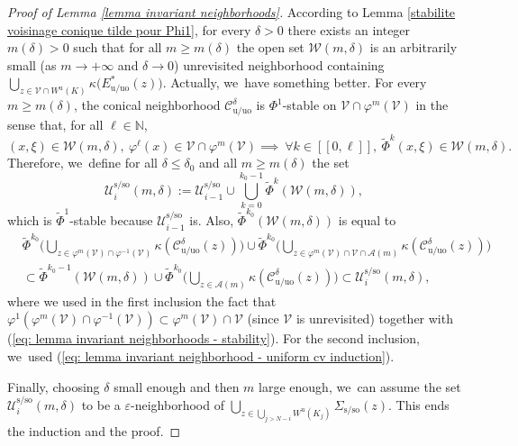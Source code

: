 \documentclass[11pt]{article}
\let\oldbigcup\bigcup
\newcommand{\lcr}{[\![}
\newcommand{\rcr}{]\!]}
\newcommand{\rs}{\mathrm{s}}
\newcommand{\rso}{\mathrm{so}}
\newcommand{\ru}{\mathrm{u}}
\newcommand{\ruo}{\mathrm{uo}}
\theoremstyle{definition}
\theoremstyle{plain}
\newcommand{\Acal}{\mathcal{A}}
\newcommand{\Ccal}{\mathcal{C}}
\newcommand{\N}{\mathbb{N}}
\newcommand{\Ucal}{\mathcal{U}}
\newcommand{\Vcal}{\mathcal{V}}
\newcommand{\Wcal}{\mathcal{W}}
\begin{document}
\begin{proof}[Proof of Lemma \ref{lemma invariant neighborhoods}]
According to Lemma \ref{stabilite voisinage conique tilde pour Phi1}, for every $\delta > 0$ there exists an integer $m(\delta) > 0$ such that for all $m \geq m (\delta)$ the open set $\Wcal(m,\delta)$ is an arbitrarily small (as $m \to + \infty$ and $\delta \to 0$) unrevisited neighborhood containing $\bigcup_{z \in \Vcal\cap W^\ru (K)} \kappa \bigl(E_{\ru/\ruo}^* (z) \bigr)$. Actually, we~have something better. For every $m \geq m(\delta)$, the conical neighborhood $\Ccal_{\ru/\ruo}^{\delta}$ is $\Phi^1$-stable on $\Vcal \cap \varphi^m (\Vcal)$ in the sense that, for all $\ell \in \N$,
\begin{equation}\label{eq: lemma invariant neighborhoods - stability}
(x,\xi) \in \Wcal (m,\delta), \: \varphi^{\ell} (x) \in \Vcal \cap \varphi^{m} (\Vcal) \implies \: \forall k \in \lcr0, \ell \rcr, \: \widetilde{\Phi}^k (x,\xi) \in \Wcal (m,\delta).
\end{equation}
Therefore, we~define for all $\delta \leq \delta_0$ and all $m \geq m (\delta)$ the set
\[
\Ucal_i^{\rs/\rso} (m,\delta):= \Ucal_{i-1}^{\rs/\rso} \cup \bigcup_{k = 0}^{k_0 - 1} \widetilde{\Phi}^k (\Wcal (m,\delta)),
\]
which is $\widetilde{\Phi}^1$-stable because $\Ucal_{i-1}^{\rs/\rso}$ is. Also, $\widetilde{\Phi}^{k_0} (\Wcal (m,\delta))$ is equal to
\begin{align*}
& \widetilde{\Phi}^{k_0 } \biggl(\bigcup_{z \in \varphi^{m} (\Vcal) \cap \varphi^{-1} (\Vcal)} \kappa (\Ccal_{\ru/\ruo}^{\delta}(z)) \biggr) \cup \widetilde{\Phi}^{k_0} \biggl(\bigcup_{z \in \varphi^m (\Vcal) \cap \Vcal \cap \Acal (m)} \kappa (\Ccal_{\ru/\ruo}^{\delta}(z)) \biggr) \\
&\subset \widetilde{\Phi}^{k_0 -1} \left(\Wcal (m,\delta) \right) \cup \widetilde{\Phi}^{k_0} \biggl(\bigcup_{z \in \Acal (m)} \kappa (\Ccal_{\ru/\ruo}^{\delta}(z)) \biggr) \subset \Ucal_i^{\rs/\rso} (m,\delta),
\end{align*}
where we used in the first inclusion the fact that $\varphi^{1} (\varphi^m (\Vcal) \cap \varphi^{-1} (\Vcal)) \subset \varphi^m (\Vcal) \cap \Vcal$ (since $\Vcal$ is unrevisited) together with (\ref{eq: lemma invariant neighborhoods - stability}). For the second inclusion, we~used (\ref{eq: lemma invariant neighborhood - uniform cv induction}).

Finally, choosing $\delta$ small enough and then $m$ large enough, we~can assume the set $\Ucal_i^{\rs/\rso} (m,\delta)$ to be a $\varepsilon$-neighborhood of $\bigcup_{z \in \oldbigcup_{j > N-i} W^\ru (K_j)} \Sigma_{\rs/\rso} (z)$. This ends the induction and the proof.
\end{proof}
\end{document}
